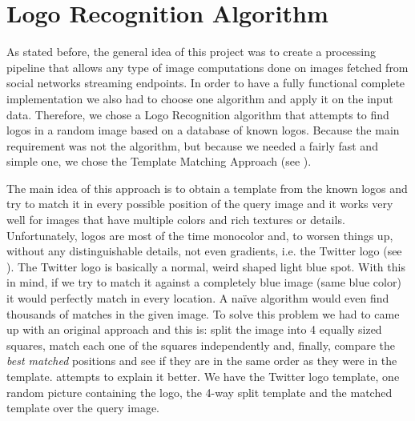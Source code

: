 
\section{Logo Recognition Algorithm}
\label{sec:logo-alg}

As stated before, the general idea of this project was to create a processing
pipeline that allows any type of image computations done on images fetched
from social networks streaming endpoints. In order to have a fully functional
complete implementation we also had to choose one algorithm and apply it on
the input data. Therefore, we chose a Logo Recognition algorithm that attempts
to find logos in a random image based on a database of known logos. Because
the main requirement was not the algorithm, but because we needed a fairly
fast and simple one, we chose the Template Matching Approach (see
).

The main idea of this approach is to obtain a template from the known logos
and try to match it in every possible position of the query image and it works
very well for images that have multiple colors and rich textures or details.
Unfortunately, logos are most of the time monocolor and, to worsen things up,
without any distinguishable details, not even gradients, i.e. the Twitter
logo (see ). The Twitter logo is basically
a normal, weird shaped light blue spot. With this in mind, if we try to match
it against a completely blue image (same blue color) it would perfectly match
in every location. A na{\"i}ve algorithm would even find thousands of matches
in the given image. To solve this problem we had to came up with an original
approach and this is: split the image into 4 equally sized squares, match
each one of the squares independently and, finally, compare the \textit{best
matched} positions and see if they are in the same order as they were in the
template.  attempts to explain it better.
We have the Twitter logo template, one random picture containing the logo,
the 4-way split template and the matched template over the query image.

